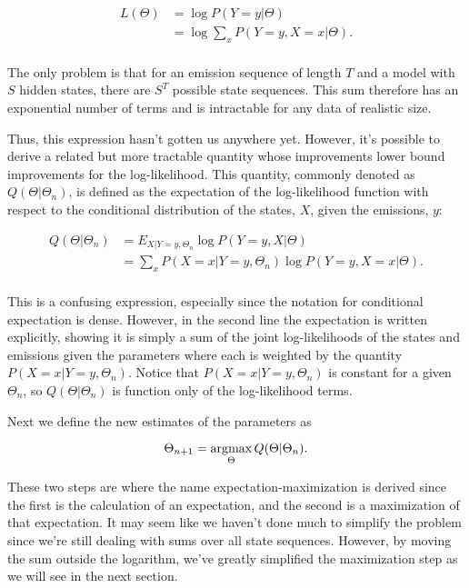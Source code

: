 \begin{align*}
L(\Theta)
&= \log P(Y=y|\Theta) \\
&= \log \sum_x P(Y=y, X=x|\Theta). \\
\end{align*}

The only problem is that for an emission sequence of length $T$ and a model with $S$ hidden states, there are $S^T$ possible state sequences. This sum therefore has an exponential number of terms and is intractable for any data of realistic size.

Thus, this expression hasn't gotten us anywhere yet. However, it's possible to derive a related but more tractable quantity whose improvements lower bound improvements for the log-likelihood. This quantity, commonly denoted as $Q(\Theta|\Theta_n)$, is defined as the expectation of the log-likelihood function with respect to the conditional distribution of the states, $X$, given the emissions, $y$:

\begin{align*}
Q(\Theta|\Theta_n)
&= E_{X|Y=y,\Theta_n} \log P(Y=y, X|\Theta) \\
&= \sum_x P(X=x|Y=y, \Theta_n) \log P(Y=y, X=x|\Theta). \\
\end{align*}

This is a confusing expression, especially since the notation for conditional expectation is dense. However, in the second line the expectation is written explicitly, showing it is simply a sum of the joint log-likelihoods of the states and emissions given the parameters where each is weighted by the quantity $P(X=x|Y=y, \Theta_n)$. Notice that $P(X=x|Y=y, \Theta_n)$ is constant for a given $\Theta_n$, so $Q(\Theta|\Theta_n)$ is function only of the log-likelihood terms.

Next we define the new estimates of the parameters as

\begin{equation*}
\Theta_{n+1} = \operatorname*{arg\!\max}_\Theta Q(\Theta|\Theta_n).
\end{equation*}

These two steps are where the name expectation-maximization is derived since the first is the calculation of an expectation, and the second is a maximization of that expectation. It may seem like we haven't done much to simplify the problem since we're still dealing with sums over all state sequences. However, by moving the sum outside the logarithm, we've greatly simplified the maximization step as we will see in the next section.

